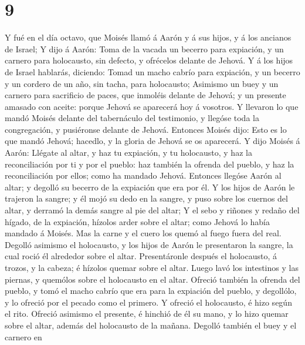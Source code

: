 \hypertarget{section-8}{%
\section{9}\label{section-8}}

 Y fué en el día octavo, que Moisés llamó á Aarón y á sus
hijos, y á los ancianos de Israel;  Y dijo á Aarón: Toma
de la vacada un becerro para expiación, y un carnero para holocausto,
sin defecto, y ofrécelos delante de Jehová.  Y á los hijos
de Israel hablarás, diciendo: Tomad un macho cabrío para expiación, y un
becerro y un cordero de un año, sin tacha, para holocausto;
 Asimismo un buey y un carnero para sacrificio de paces,
que inmoléis delante de Jehová; y un presente amasado con aceite: porque
Jehová se aparecerá hoy á vosotros.  Y llevaron lo que
mandó Moisés delante del tabernáculo del testimonio, y llegóse toda la
congregación, y pusiéronse delante de Jehová.  Entonces
Moisés dijo: Esto es lo que mandó Jehová; hacedlo, y la gloria de Jehová
se os aparecerá.  Y dijo Moisés á Aarón: Llégate al altar,
y haz tu expiación, y tu holocausto, y haz la reconciliación por ti y
por el pueblo: haz también la ofrenda del pueblo, y haz la
reconciliación por ellos; como ha mandado Jehová. 
Entonces llegóse Aarón al altar; y degolló su becerro de la expiación
que era por él.  Y los hijos de Aarón le trajeron la
sangre; y él mojó su dedo en la sangre, y puso sobre los cuernos del
altar, y derramó la demás sangre al pie del altar;  Y el
sebo y riñones y redaño del hígado, de la expiación, hízolos arder sobre
el altar; como Jehová lo había mandado á Moisés.  Mas la
carne y el cuero los quemó al fuego fuera del real. 
Degolló asimismo el holocausto, y los hijos de Aarón le presentaron la
sangre, la cual roció él alrededor sobre el altar. 
Presentáronle después el holocausto, á trozos, y la cabeza; é hízolos
quemar sobre el altar.  Luego lavó los intestinos y las
piernas, y quemólos sobre el holocausto en el altar. 
Ofreció también la ofrenda del pueblo, y tomó el macho cabrío que era
para la expiación del pueblo, y degollólo, y lo ofreció por el pecado
como el primero.  Y ofreció el holocausto, é hizo según
el rito.  Ofreció asimismo el presente, é hinchió de él
su mano, y lo hizo quemar sobre el altar, además del holocausto de la
mañana.  Degolló también el buey y el carnero en
